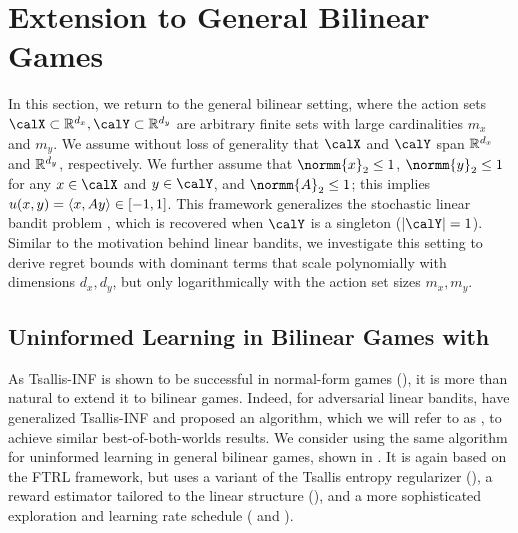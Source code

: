\section{Extension to General Bilinear Games}\label{h1:linear-games}

In this section, we return to the general bilinear setting, where the action sets $\calX \subset \dR^{d_x}, \calY \subset \dR^{d_y}$ are arbitrary finite sets with large cardinalities $m_x$ and $m_y$.
We assume without loss of generality that $\calX$ and $\calY$ span $\mathbb{R}^{d_x}$ and $\mathbb{R}^{d_y}$, respectively. We further assume that $\normm{x}_2\leq 1$, $\normm{y}_2\leq 1$ for any $x\in \calX$ and $y\in \calY$, and $\normm{A}_2 \leq 1$; this implies $u(x,y)=\inner{x}{Ay}\in [-1, 1]$.
This framework generalizes the stochastic linear bandit problem \citep{abbasi-yadkori2011improved}, which is recovered when $\calY$ is a singleton ($|\calY|=1$).
Similar to the motivation behind linear bandits, we investigate this setting to derive
regret bounds with dominant terms that scale polynomially with dimensions $d_x, d_y$, but only logarithmically with the action set sizes $m_x,m_y$.

\subsection{Uninformed Learning in Bilinear Games with \TsallisSPM{}}\label{h2:tsallis-spm}

As Tsallis-INF is shown to be successful in normal-form games (), it is more than natural to extend it to bilinear games.
Indeed, for adversarial linear bandits, \citet{ito2024adaptive} have generalized Tsallis-INF and proposed an algorithm, which we will refer to as \TsallisSPM, to achieve similar best-of-both-worlds results.
We consider using the same algorithm for uninformed learning in general bilinear games, shown in .
It is again based on the FTRL framework,
but uses a variant of the Tsallis entropy regularizer (),
a reward estimator tailored to the linear structure (), and a more sophisticated exploration and learning rate schedule ( and ).

